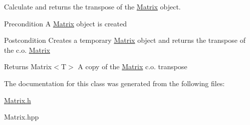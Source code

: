 Calculate and returns the transpose of the \mbox{\hyperlink{class_matrix}{Matrix}} object. 

\begin{DoxyPrecond}{Precondition}
A \mbox{\hyperlink{class_matrix}{Matrix}} object is created 
\end{DoxyPrecond}
\begin{DoxyPostcond}{Postcondition}
Creates a temporary \mbox{\hyperlink{class_matrix}{Matrix}} object and returns the transpose of the c.\+o. \mbox{\hyperlink{class_matrix}{Matrix}} 
\end{DoxyPostcond}
\begin{DoxyReturn}{Returns}
Matrix$<$\+T$>$ A copy of the \mbox{\hyperlink{class_matrix}{Matrix}} c.\+o. transpose 
\end{DoxyReturn}


The documentation for this class was generated from the following files\+:\begin{DoxyCompactItemize}
\item 
\mbox{\hyperlink{_matrix_8h}{Matrix.\+h}}\item 
Matrix.\+hpp\end{DoxyCompactItemize}
